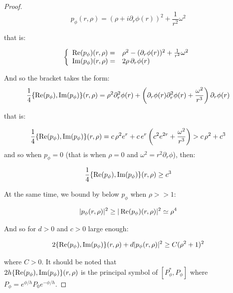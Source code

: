 \documentclass[leqno,11pt,letterpaper, english]{amsart}
\renewcommand{\Re}{\mathop{\rm Re}\nolimits}
\renewcommand{\Im}{\mathop{\rm Im}\nolimits}
\newcommand{\nn}{\nonumber}
\theoremstyle{plain}
\theoremstyle{definition}
\numberwithin{equation}{section}
\begin{document}
\begin{proof}
\begin{equation}
    p_{\phi}(r,\rho)= (\rho+ i\partial_{r}\phi(r))^2 + \frac{1}{r^2}\omega^2
\end{equation}

that is:

\begin{align}
    \left\{
    \begin{array}{ll}
        \Re(p_{\phi})(r,\rho)= & \rho^2 - (\partial_{r}\phi(r))^2+ \frac{1}{r^2}\omega^2 \nn \\
        \Im(p_{\phi})(r,\rho)= & 2\rho \, \partial_r\phi(r) \nn
    \end{array}
\right.
\end{align}

And so the bracket takes the form:
\begin{equation}
    \frac{1}{4}\{\Re(p_\phi),\Im(p_\phi)\}(r,\rho)= \rho^2\partial_r^2\phi(r) +\left(\partial_r \phi(r)\partial_r^2\phi(r)+\frac{\omega^2}{r^3}\right)\partial_r\phi(r)
\end{equation} 

that is: 

\begin{equation}
    \frac{1}{4}\{\Re(p_\phi),\Im(p_\phi)\}(r,\rho)= c\,\rho^2e^{r} +c\,e^{r}\left(c^2e^{2r}+\frac{\omega^2}{r^3}\right) > c\,\rho^2 +c^3
\end{equation}
and so when $p_\phi=0$ (that is when $\rho=0$ and $\omega^2=r^2 \partial_r \phi$), then:

\begin{equation}
    \frac{1}{4}\{\Re(p_\phi),\Im(p_\phi)\}(r,\rho)\geq c^3
\end{equation}

At the same time, we bound by below $p_{\phi}$  when $\rho>>1$:

\begin{equation}
    |p_{\phi}(r,\rho)|^2\geq |\Re(p_\phi)(r,\rho)|^2\simeq \rho^4
\end{equation}

And so for $d>0$ and $c>0$ large enough:

\begin{equation}
    2\{\Re(p_\phi),\Im(p_\phi)\}(r,\rho) +d |p_{\phi}(r,\rho)|^2 \geq C(\rho^2+1)^2
\end{equation}

where $C>0$. It should be noted that \\
$2h\{\Re(p_\phi),\Im(p_\phi)\}(r,\rho)$ is the principal symbol of $\left[ P_{\phi}^\ast  , P_{\phi} \right]$ where $P_\phi=e^{\phi/h}P_0e^{-\phi/h}$.


\end{proof}
\end{document}
